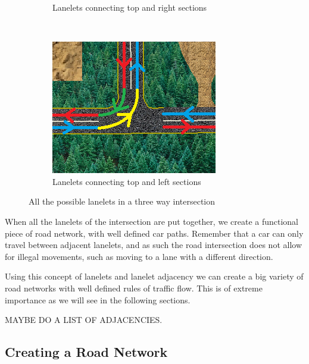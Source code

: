 \begin{figure}
\begin{subfigure}[b]{0.3\textwidth}
        \caption{Lanelets connecting top and right sections}
        \label{fig:intersection_paths_group_2}
    \end{subfigure}
    ~ %
    \begin{subfigure}[b]{0.3\textwidth}
        \includegraphics[width=\textwidth]{intersection_paths_group_3}
        \caption{Lanelets connecting top and left sections}
        \label{fig:intersection_paths_group_3}
    \end{subfigure}
    \caption{All the possible lanelets in a three way intersection}
\end{figure}

When all the lanelets of the intersection are put together, we create a functional piece of road network, with well defined car paths. Remember that a car can only travel between adjacent lanelets, and as such the road intersection does not allow for illegal movements, such as moving to a lane with a different direction.

Using this concept of lanelets and lanelet adjacency we can create a big variety of road networks with well defined rules of traffic flow. This is of extreme importance as we will see in the following sections.

MAYBE DO A LIST OF ADJACENCIES.

\subsection{Creating a Road Network}

